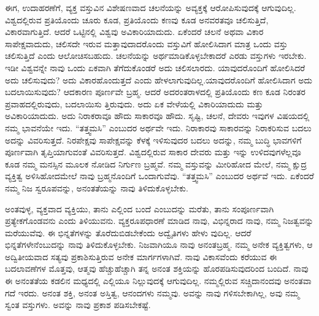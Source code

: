 ಈಗ, ಉದಾಹರಣೆಗೆ, ವ್ಯಕ್ತ ವಸ್ತುವಿನ ವಿಶೇಷಣವಾದ ಚಲನೆಯನ್ನು ಅವ್ಯಕ್ತಕ್ಕೆ ಆರೋಪಿಸುವುದಕ್ಕೆ ಆಗುವುದಿಲ್ಲ. ವಿಶ್ವದಲ್ಲಿರುವ ಪ್ರತಿಯೊಂದು ಚೂರು ಕೂಡ, ಪ್ರತಿಯೊಂದು ಕಣವು ಕೂಡ ಅನವರತವೂ ಚಲಿಸುತ್ತಿದೆ, ವಿಕಾರವಾಗುತ್ತಿದೆ. ಆದರೆ ಒಟ್ಟಿನಲ್ಲಿ ವಿಶ್ವವು ಅವಿಕಾರಿಯಾದುದು. ಏಕೆಂದರೆ ಚಲನೆ ಅಥವಾ ವಿಕಾರ ಸಾಪೇಕ್ಷವಾದುದು, ಚಲಿಸದೇ ಇರುವ ಮತ್ತಾವುದಾದರೊಂದು ವಸ್ತುವಿಗೆ ಹೋಲಿಸಿದಾಗ ಮಾತ್ರ ಒಂದು ವಸ್ತು ಚಲಿಸುತ್ತಿದೆ ಎಂದು ಆಲೋಚಿಸಬಹುದು. ಚಲನೆಯನ್ನು ಅರ್ಥಮಾಡಿಕೊಳ್ಳಬೇಕಾದರೆ ಎರಡು ವಸ್ತುಗಳು ಇರಬೇಕು. ಇಡೀ ವಿಶ್ವವನ್ನೇ ನಾವು ಒಂದು ಏಕವಾಗಿ ತೆಗೆದುಕೊಂಡರೆ ಅದು ಚಲಿಸಲಾರದು. ಯಾವುದರೊಂದಿಗೆ ಹೋಲಿಸಿದರೆ ಅದು ಚಲಿಸುವುದು? ಅದು ವಿಕಾರಹೊಂದುತ್ತದೆ ಎಂದು ಹೇಳಲಾಗುವುದಿಲ್ಲ.ಯಾವುದರೊಂದಿಗೆ ಹೋಲಿಸಿದಾಗ ಅದು ಬದಲಾಯಿಸುವುದು? ಆದಕಾರಣ ಪೂರ್ಣವೇ ಬ್ರಹ್ಮ. ಆದರೆ ಅದರಂತರಾಳದಲ್ಲಿ ಪ್ರತಿಯೊಂದು ಕಣ ಕೂಡ ನಿರಂತರ ಪ್ರವಾಹದಲ್ಲಿರುವುದು, ಬದಲಾಯಿಸು ತ್ತಿರುವುದು. ಅದು ಏಕ ವೇಳೆಯಲ್ಲಿ ವಿಕಾರಿಯಾದುದು ಮತ್ತು ಅವಿಕಾರಿಯಾದುದು. ಅದು ನಿರಾಕರಾವೂ ಹೌದು ಸಾಕಾರವೂ ಹೌದು. ಸೃಷ್ಟಿ, ಚಲನೆ, ದೇವರು ಇವುಗಳ ವಿಷಯದಲ್ಲಿ ನಮ್ಮ ಭಾವನೆಯೇ ಇದು. “ತತ್ತ್ವಮಸಿ” ಎಂಬುದರ ಅರ್ಥವೇ ಇದು. ನಿರಾಕಾರವು ಸಾಕಾರವನ್ನು ನಿರಾಕರಿಸುವ ಬದಲು ಅದನ್ನು ವಿವರಿಸುತ್ತದೆ. ನಿರಪೇಕ್ಷವು ಸಾಪೇಕ್ಷವನ್ನು ಕೆಳಕ್ಕೆ ಇಳಿಸುವುದರ ಬದಲು ಅದನ್ನು, ನಮ್ಮ ಬುದ್ಧಿ ಭಾವಗಳಿಗೆ ಪೂರ್ಣವಾಗಿ ತೃಪ್ತಿಯಾಗುವಂತೆ ವಿವರಿಸುತ್ತದೆ. ವಿಶ್ವದಲ್ಲಿರುವ ಸಾಕಾರ ದೇವರು ಮತ್ತು ಇನ್ನು ಉಳಿದವುಗಳೆಲ್ಲವೂ ಕೂಡ ನಮ್ಮ ಮನಸ್ಸಿನ ಮೂಲಕ ನೋಡಿದ ನಿರ್ಗುಣ ಬ್ರಹ್ಮವೆ. ನಮ್ಮ ವಸ್ತುವನ್ನು ಮೀರಿಹೋದ ಮೇಲೆ, ನಮ್ಮ ಕ್ಷುದ್ರ ವ್ಯಕ್ತಿತ್ವ ಅಳಿಸಿಹೋದಮೇಲೆ ನಾವು ಬ್ರಹ್ಮನೊಂದಿಗೆ ಒಂದಾಗುವೆವು. “ತತ್ತ್ವಮಸಿ” ಎಂಬುದರ ಅರ್ಥವೆ ಇದು. ಏಕೆಂದರೆ ನಮ್ಮ ನಿಜ ಸ್ವರೂಪವನ್ನು, ಅನಂತತೆಯನ್ನು ನಾವು ತಿಳಿದುಕೊಳ್ಳಬೇಕು.

ಅಂತವುಳ್ಳ, ವ್ಯಕ್ತವಾದ ವ್ಯಕ್ತಿಯು, ತಾನು ಎಲ್ಲಿಂದ ಬಂದೆ ಎಂಬುದನ್ನು ಮರೆತು, ತಾನು ಸಂಪೂರ್ಣವಾಗಿ ಪ್ರತ್ಯೇಕಗೊಂಡವನು ಎಂದು ತಿಳಿಯುವನು. ವ್ಯಕ್ತರೂಪಧಾರಣೆ ಮಾಡಿದ ನಾವು, ವಿಭಿನ್ನರಾದ ನಾವು, ನಮ್ಮ ನಿಜತ್ವವನ್ನು ಮರೆಯುವೆವು. ಈ ಭಿನ್ನತೆಗಳನ್ನು ತೊರೆದುಬಿಡಬೇಕೆಂದು ಅದ್ವೈತಿಗಳು ಹೇಳು ವುದಿಲ್ಲ. ಆದರೆ ಭಿನ್ನತೆಗಳೇನೆಂಬುದನ್ನು ನಾವು ತಿಳಿದುಕೊಳ್ಳಬೇಕು. ನಿಜವಾಗಿಯೂ ನಾವು ಅನಂತಬ್ರಹ್ಮ. ನಮ್ಮ ಅನೇಕ ವ್ಯಕ್ತಿತ್ವಗಳು, ಆ ಅದ್ವಿತೀಯವಾದ ಸತ್ಯವು ಪ್ರಕಾಶಿಸುತ್ತಿರುವ ಅನೇಕ ಮಾರ್ಗಗಳಾಗಿವೆ. ನಾವು ವಿಕಾಸವೆಂದು ಕರೆಯುವ ಈ ಬದಲಾವಣೆಗಳ ಮೊತ್ತವು, ಆತ್ಮವು ಹೆಚ್ಚುಹೆಚ್ಚಾಗಿ ತನ್ನ ಅನಂತ ಶಕ್ತಿಯನ್ನು ಹೊರಪಡಿಸುವುದರಿಂದ ಬಂದಿದೆ. ನಾವು ಈ ಅನಂತತೆಯ ಕಡಲಿನ ಮಧ್ಯದಲ್ಲಿ ಎಲ್ಲಿಯೂ ನಿಲ್ಲುವುದಕ್ಕೆ ಆಗುವುದಿಲ್ಲ. ನಮ್ಮಲ್ಲಿರುವ ಸಚ್ಚಿದಾನಂದವು ಅನಂತವಾ ಗದೆ ಇರದು. ಅನಂತ ಶಕ್ತಿ, ಅನಂತ ಅಸ್ತಿತ್ವ, ಆನಂದಗಳು ನಮ್ಮವು. ಅವನ್ನು ನಾವು ಗಳಿಸಬೇಕಾಗಿಲ್ಲ, ಅವು ನಮ್ಮ ಸ್ವಂತ ವಸ್ತುಗಳು. ಅವನ್ನು ನಾವು ಪ್ರಕಾಶ ಪಡಿಸಬೇಕಷ್ಟೆ.

